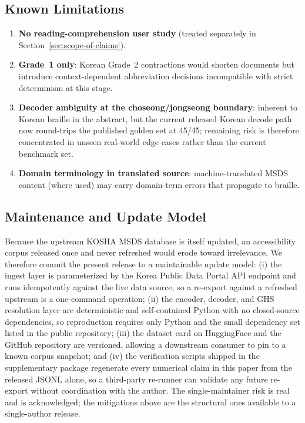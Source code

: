 \documentclass[journal]{IEEEtran}
\begin{document}
\subsection{Known Limitations}

\begin{enumerate}
\item \textbf{No reading-comprehension user study} (treated separately in Section~\ref{sec:scope-of-claims}).
\item \textbf{Grade~1 only}: Korean Grade~2 contractions would shorten documents but introduce context-dependent abbreviation decisions incompatible with strict determinism at this stage.
\item \textbf{Decoder ambiguity at the choseong/jongseong boundary}: inherent to Korean braille in the abstract, but the current released Korean decode path now round-trips the published golden set at 45/45; remaining risk is therefore concentrated in unseen real-world edge cases rather than the current benchmark set.
\item \textbf{Domain terminology in translated source}: machine-translated MSDS content (where used) may carry domain-term errors that propagate to braille.
\end{enumerate}

\subsection{Maintenance and Update Model}
\label{sec:maintenance}

Because the upstream KOSHA MSDS database is itself updated, an accessibility corpus released once and never refreshed would erode toward irrelevance. We therefore commit the present release to a maintainable update model: (i) the ingest layer is parameterized by the Korea Public Data Portal API endpoint and runs idempotently against the live data source, so a re-export against a refreshed upstream is a one-command operation; (ii) the encoder, decoder, and GHS resolution layer are deterministic and self-contained Python with no closed-source dependencies, so reproduction requires only Python and the small dependency set listed in the public repository; (iii) the dataset card on HuggingFace and the GitHub repository are versioned, allowing a downstream consumer to pin to a known corpus snapshot; and (iv) the verification scripts shipped in the supplementary package regenerate every numerical claim in this paper from the released JSONL alone, so a third-party re-runner can validate any future re-export without coordination with the author. The single-maintainer risk is real and is acknowledged; the mitigations above are the structural ones available to a single-author release.
\end{document}
